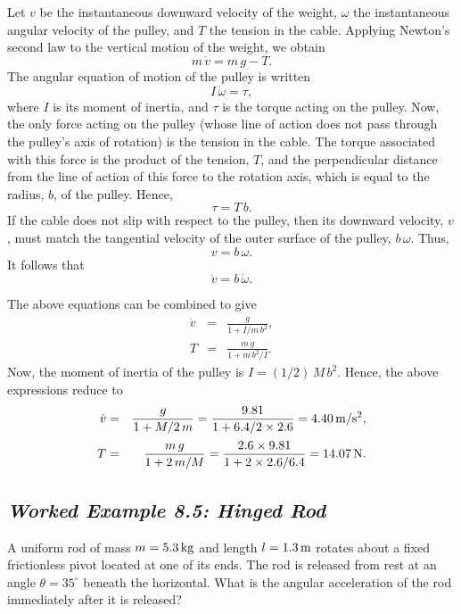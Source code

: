 \begin{figure*}[h]
\epsfysize=2.5in
\centerline{}
\end{figure*}

 Let $v$ be the instantaneous downward velocity of the weight, $\omega$ the
instantaneous angular velocity of the pulley, and $T$ the tension in the cable.
Applying Newton's second law to the vertical motion of the weight, we obtain
$$
m\, \dot{v} = m\,g-T.
$$
The angular equation of motion of the pulley is written
$$
I\,\dot{\omega} = \tau,
$$
where $I$ is its moment of inertia, and $\tau$ is the torque acting
on the pulley. Now, the only force acting on the pulley (whose
line of action does not pass through the pulley's axis of rotation) is the tension in the cable. The
torque associated with this force is the product of the tension, $T$, and the perpendicular
distance from the line of action of this force to the rotation axis, which is equal to the
radius, $b$, of the pulley. Hence,
$$
\tau = T\,b.
$$
If the cable does not slip with respect to the pulley, then its
downward velocity, $v$, must match the tangential velocity of the outer surface of the
pulley, $b\,\omega$. Thus,
$$
v = b\,\omega.
$$
It follows that
$$
\dot{v} = b\,\dot{\omega}.
$$

The above equations can be combined to give
\begin{eqnarray}
\dot{v} &=& \frac{g}{1+I/m\,b^2},\nonumber\\[0.5ex]
T &=& \frac{m\,g}{1+ m\,b^2/I}.\nonumber
\end{eqnarray}
Now, the moment of inertia of the pulley is $I=(1/2)\,M\,b^2$. Hence,
the above expressions reduce to
\begin{eqnarray}
\dot{v} &=& \frac{g}{1+M/2\,m} = \frac{9.81}{1+6.4/2\times 2.6}=4.40\,{\rm m/s^2},\nonumber\\[0.5ex]
T &=& \frac{m\,g}{1+ 2\,m/M}= \frac{2.6\times 9.81}{1+2\times 2.6/6.4}
=14.07\,{\rm N}.\nonumber
\end{eqnarray}

\subsection*{\em Worked Example 8.5: Hinged Rod}
 A uniform rod of mass $m=5.3\,{\rm kg}$ and length $l=1.3\,{\rm m}$
rotates about a fixed frictionless pivot located at one of its ends. The rod is released from
rest at an angle $\theta=35^\circ$ beneath the horizontal. What is the angular acceleration
of the rod immediately after it is released?

